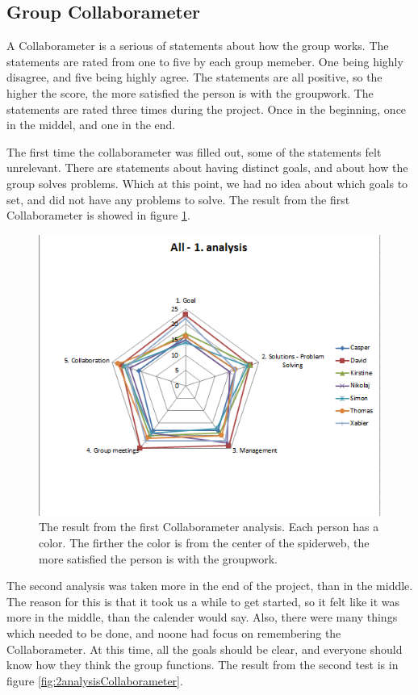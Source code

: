 \subsection{Group Collaborameter}
A Collaborameter is a serious of statements about how the group works. The statements are rated from one to five by each group memeber. One being highly disagree, and five being highly agree. The statements are all positive, so the higher the score, the more satisfied the person is with the groupwork. The statements are rated three times during the project. Once in the beginning, once in the middel, and one in the end. 

The first time the collaborameter was filled out, some of the statements felt unrelevant. There are statements about having distinct goals, and about how the group solves problems. Which at this point, we had no idea about which goals to set, and did not have any problems to solve. The result from the first Collaborameter is showed in figure \ref{fig:1analysisCollaborameter}.

\begin{figure}
\centering
\includegraphics[width=0.7\linewidth]{graphics/1analysisCollaborameter}
\caption{The result from the first Collaborameter analysis. Each person has a color. The firther the color is from the center of the spiderweb, the more satisfied the person is with the groupwork.}
\label{fig:1analysisCollaborameter}
\end{figure}


The second analysis was taken more in the end of the project, than in the middle. The reason for this is that it took us a while to get started, so it felt like it was more in the middle, than the calender would say. Also, there were many things which needed to be done, and noone had focus on remembering the Collaborameter. At this time, all the goals should be clear, and everyone should know how they think the group functions. The result from the second test is in figure \ref{fig:2analysisCollaborameter}.

